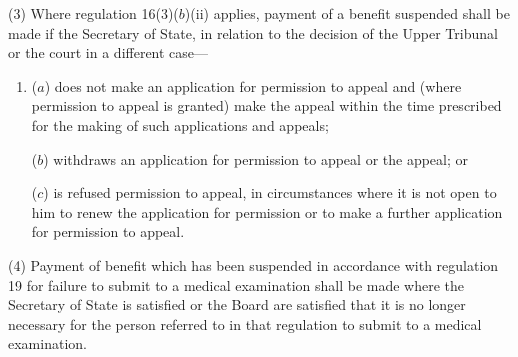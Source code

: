 \documentclass[12pt,a4paper]{article}
\begin{document}
(3) Where regulation 16(3)($b$)(ii)  applies, payment of a benefit suspended shall be made if the Secretary of State, in relation to the decision of 
the Upper Tribunal  %
or the court in a different case—
\begin{enumerate}\item[]
($a$) does not make an application for 
permission  %
to appeal and (where 
permission  %
to appeal is granted) make the appeal within the time prescribed for the making of such applications and appeals;

($b$) withdraws an application for 
permission  %
to appeal or the appeal; or

($c$) is refused 
permission  %
to appeal, in circumstances where it is not open to him to renew the application for 
permission  %
or to make a further application for 
permission  %
to appeal.
\end{enumerate}

(4) Payment of benefit which has been suspended in accordance with regulation 19 for failure to submit to a medical examination shall be made where the Secretary of State is satisfied 
or the Board are satisfied  %
that it is no longer necessary for the person referred to in that regulation to submit to a medical examination.

\end{document}
